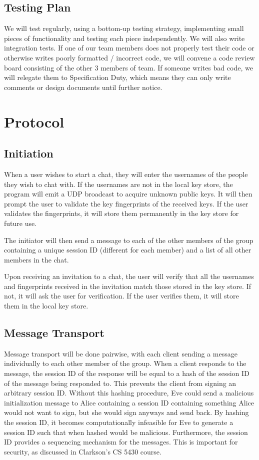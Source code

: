 \documentclass{scrartcl}
\begin{document}
\subsection{Testing Plan}
We will test regularly, using a bottom-up testing strategy, implementing small pieces of functionality and testing each piece independently. We will also write integration tests. If one of our team members does not properly test their code or otherwise writes poorly formatted / incorrect code, we will convene a code review board consisting of the other 3 members of team. If someone writes bad code, we will relegate them to Specification Duty, which means they can only write comments or design documents until further notice.

\section{Protocol}
\subsection{Initiation}
When a user wishes to start a chat, they will enter the usernames of the people they wish to chat with. If the usernames are not in the local key store, the program will emit a UDP broadcast to acquire unknown public keys. It will then prompt the user to validate the key fingerprints of the received keys. If the user validates the fingerprints, it will store them permanently in the key store for future use.

The initiator will then send a message to each of the other members of the group containing a unique session ID (different for each member) and a list of all other members in the chat.

Upon receiving an invitation to a chat, the user will verify that all the usernames and fingerprints received in the invitation match those stored in the key store. If not, it will ask the user for verification. If the user verifies them, it will store them in the local key store.

\subsection{Message Transport}
Message transport will be done pairwise, with each client sending a message individually to each other member of the group. When a client responds to the message, the session ID of the response will be equal to a hash of the session ID of the message being responded to. This prevents the client from signing an arbitrary session ID. Without this hashing procedure, Eve could send a malicious initialization message to Alice containing a session ID containing something Alice would not want to sign, but she would sign anyways and send back. By hashing the session ID, it becomes computationally infeasible for Eve to generate a session ID such that when hashed would be malicious. Furthermore, the session ID provides a sequencing mechanism for the messages. This is important for security, as discussed in Clarkson's CS 5430 course. 
\end{document}
